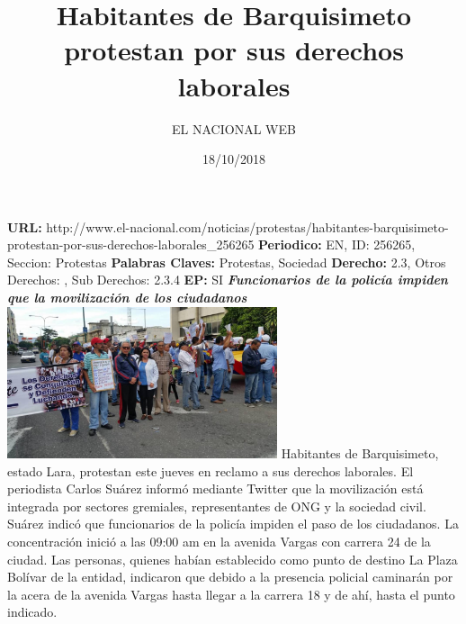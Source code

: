 \documentclass{article}%
\title{\textbf{Habitantes de Barquisimeto protestan por sus derechos laborales}}%
\author{EL NACIONAL WEB}%
\date{18/10/2018}%
\begin{document}
%
\normalsize%
\maketitle%
\textbf{URL: }%
http://www.el{-}nacional.com/noticias/protestas/habitantes{-}barquisimeto{-}protestan{-}por{-}sus{-}derechos{-}laborales\_256265\newline%
%
\textbf{Periodico: }%
EN, %
ID: %
256265, %
Seccion: %
Protestas\newline%
%
\textbf{Palabras Claves: }%
Protestas, Sociedad\newline%
%
\textbf{Derecho: }%
2.3, %
Otros Derechos: %
, %
Sub Derechos: %
2.3.4\newline%
%
\textbf{EP: }%
SI\newline%
\newline%
%
\textbf{\textit{Funcionarios de la policía impiden que la movilización de los ciudadanos}}%
\newline%
\newline%
%
\includegraphics[width=300px]{46.jpg}%
\newline%
%
Habitantes de Barquisimeto, estado Lara, protestan este jueves en reclamo a sus derechos laborales.%
\newline%
%
El periodista Carlos Suárez informó mediante Twitter que la movilización está integrada por sectores gremiales, representantes de ONG y la sociedad civil.%
\newline%
%
Suárez indicó que funcionarios de la policía impiden el paso de los ciudadanos.%
\newline%
%
La concentración inició a las 09:00 am en la avenida Vargas con carrera 24 de la ciudad.%
\newline%
%
Las personas, quienes habían establecido como punto de destino La Plaza Bolívar de la entidad, indicaron que debido a la presencia policial caminarán por la acera de la avenida Vargas hasta llegar a la carrera 18 y de ahí, hasta el punto indicado.%
\newline%
%
\end{document}
